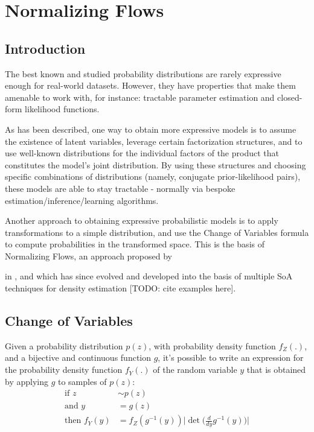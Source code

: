 \chapter{Normalizing Flows}
\label{chapter:probmodel}

\section{Introduction}
The best known and studied probability distributions are rarely expressive
enough for real-world datasets. However, they have properties that make them
amenable to work with, for instance: tractable parameter estimation and closed-form
likelihood functions.

As has been described, one way to obtain more expressive models is to assume the
existence of latent variables, leverage certain factorization structures, and to
use well-known distributions for the individual factors of the product that
constitutes the model's joint distribution. By using these structures and choosing
specific combinations of distributions (namely, conjugate prior-likelihood pairs),
these models are able to stay tractable - normally via bespoke estimation/inference/learning
algorithms.


Another approach to obtaining expressive probabilistic models is to apply
transformations to a simple distribution, and use the Change of Variables
formula to compute probabilities in the transformed space. This is the basis
of Normalizing Flows, an approach proposed by \author{shakir_nf} in \cite{shakir_nf},
and which has since evolved and developed into the basis of multiple SoA techniques
for density estimation [TODO: cite examples here].

\section{Change of Variables}
Given a probability distribution $p(z)$, with probability density function $f_Z(.)$,
and a bijective and continuous function $g$, it's possible to write an expression
for the probability density function $f_Y(.)$ of the random variable $y$ that is
obtained by applying $g$ to samples of $p(z)$:
\begin{align}
    \mbox{if } z &\sim p(z) \\
    \mbox{and } y &= g(z) \\
    \mbox{then } f_Y(y) &= f_Z(g^{-1}(y))\Big|\det\Big(\frac{d}{dy}g^{-1}(y)\Big)\Big|
\end{align}

